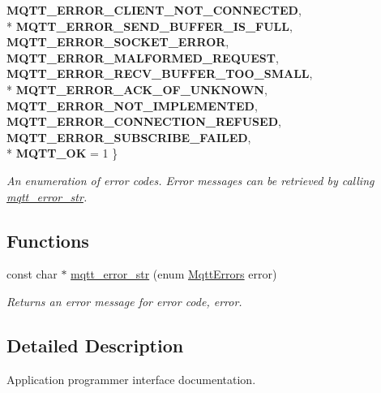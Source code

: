 \begin{DoxyCompactItemize}
{\bfseries M\+Q\+T\+T\+\_\+\+E\+R\+R\+O\+R\+\_\+\+C\+L\+I\+E\+N\+T\+\_\+\+N\+O\+T\+\_\+\+C\+O\+N\+N\+E\+C\+T\+ED}, 
\\*
{\bfseries M\+Q\+T\+T\+\_\+\+E\+R\+R\+O\+R\+\_\+\+S\+E\+N\+D\+\_\+\+B\+U\+F\+F\+E\+R\+\_\+\+I\+S\+\_\+\+F\+U\+LL}, 
{\bfseries M\+Q\+T\+T\+\_\+\+E\+R\+R\+O\+R\+\_\+\+S\+O\+C\+K\+E\+T\+\_\+\+E\+R\+R\+OR}, 
{\bfseries M\+Q\+T\+T\+\_\+\+E\+R\+R\+O\+R\+\_\+\+M\+A\+L\+F\+O\+R\+M\+E\+D\+\_\+\+R\+E\+Q\+U\+E\+ST}, 
{\bfseries M\+Q\+T\+T\+\_\+\+E\+R\+R\+O\+R\+\_\+\+R\+E\+C\+V\+\_\+\+B\+U\+F\+F\+E\+R\+\_\+\+T\+O\+O\+\_\+\+S\+M\+A\+LL}, 
\\*
{\bfseries M\+Q\+T\+T\+\_\+\+E\+R\+R\+O\+R\+\_\+\+A\+C\+K\+\_\+\+O\+F\+\_\+\+U\+N\+K\+N\+O\+WN}, 
{\bfseries M\+Q\+T\+T\+\_\+\+E\+R\+R\+O\+R\+\_\+\+N\+O\+T\+\_\+\+I\+M\+P\+L\+E\+M\+E\+N\+T\+ED}, 
{\bfseries M\+Q\+T\+T\+\_\+\+E\+R\+R\+O\+R\+\_\+\+C\+O\+N\+N\+E\+C\+T\+I\+O\+N\+\_\+\+R\+E\+F\+U\+S\+ED}, 
{\bfseries M\+Q\+T\+T\+\_\+\+E\+R\+R\+O\+R\+\_\+\+S\+U\+B\+S\+C\+R\+I\+B\+E\+\_\+\+F\+A\+I\+L\+ED}, 
\\*
{\bfseries M\+Q\+T\+T\+\_\+\+OK} = 1
 \}\begin{DoxyCompactList}\small\item\em An enumeration of error codes. Error messages can be retrieved by calling \hyperlink{group__api_ga6f0b3e9a177b03d5909e4f653fcd4038}{mqtt\+\_\+error\+\_\+str}. \end{DoxyCompactList}
\end{DoxyCompactItemize}
\subsection*{Functions}
\begin{DoxyCompactItemize}
\item 
const char $\ast$ \hyperlink{group__api_ga6f0b3e9a177b03d5909e4f653fcd4038}{mqtt\+\_\+error\+\_\+str} (enum \hyperlink{group__api_gabfef25ed21446904fd8b3a71cfa1f203}{Mqtt\+Errors} error)
\begin{DoxyCompactList}\small\item\em Returns an error message for error code, {\ttfamily error}. \end{DoxyCompactList}\end{DoxyCompactItemize}


\subsection{Detailed Description}
Application programmer interface documentation. 



